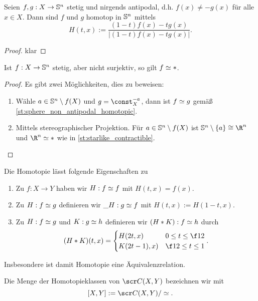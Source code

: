 \begin{st} \label{st:sphere_non_antipodal_homotopic}
	Seien $f,g : X \to \S^n$ stetig und nirgends antipodal, d.h. $f(x) \neq -g(x)$ für alle $x \in X$.
	Dann sind $f$ und $g$ homotop in $\S^n$ mittels
	\[
		H(t,x) := \dfrac {(1-t)f(x) - tg(x)}{|(1-t)f(x) - tg(x)|}.
	\]
	\begin{proof}
		klar
	\end{proof}
\end{st}

\begin{kor}
	Ist $f: X \to \S^n$ stetig, aber nicht surjektiv, so gilt $f \homotopic *$.
	\begin{proof}
		Es gibt zwei Möglichkeiten, dies zu beweisen:
		\begin{enumerate}[1.]
			\item
				Wähle $a \in \S^n \setminus f(X)$ und $g = \const_X^{-a}$, dann ist $f \homotopic g$ gemäß \ref{st:sphere_non_antipodal_homotopic}.
			\item
				Mittels stereographischer Projektion.
				Für $a \in \S^n \setminus f(X)$ ist $\S^n \setminus \{a\} \homeomorphic \R^n$ und $\R^n \homotopic *$ wie in \ref{st:starlike_contractible}.
		\end{enumerate}
	\end{proof}
\end{kor}

\begin{df}
	Die Homotopie lässt folgende Eigenschaften zu
	\begin{enumerate}[(1)]
		\item
			Zu $f: X \to Y$ haben wir $H: f \homotopic f$ mit $H(t,x) = f(x)$.
		\item
			Zu $H: f \homotopic g$ definieren wir $\_H: g \homotopic f$ mit $H(t,x) := H(1-t,x)$.
		\item
			Zu $H: f \homotopic g$ und $K: g\homotopic h$ definieren wir $(H \ast K) : f \homotopic h$ durch
			\[
				(H \ast K)(t,x) = \begin{cases}
					H(2t, x) & 0 \le t \le \f 12 \\
					K(2t-1), x) & \f 12 \le t \le 1
				\end{cases}.
			\]
	\end{enumerate}
	Insbesondere ist damit Homotopie eine Äquivalenzrelation.
\end{df}

\begin{df}
	Die Menge der Homotopieklassen von $\scr C(X, Y)$ bezeichnen wir mit
	\[
		[X,Y] := \scr C(X, Y) / \homotopic.
	\]
\end{df}

